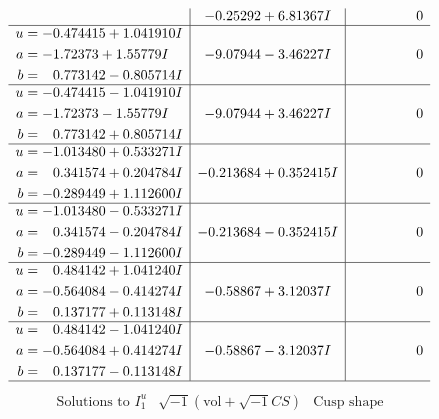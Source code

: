 \documentclass[1p]{elsarticle_modified}
\theoremstyle{definition}
\newcommand{\I}{\sqrt{-1}}
\begin{document}
$$\begin{array}{c|c|c}
 & -0.25292 + 6.81367 I & \phantom{-0.000000 } 0 \\ \hline\begin{aligned}
u &= -0.474415 + 1.041910 I \\
a &= -1.72373 + 1.55779 I \\
b &= \phantom{-}0.773142 - 0.805714 I\end{aligned}
 & -9.07944 - 3.46227 I & \phantom{-0.000000 } 0 \\ \hline\begin{aligned}
u &= -0.474415 - 1.041910 I \\
a &= -1.72373 - 1.55779 I \\
b &= \phantom{-}0.773142 + 0.805714 I\end{aligned}
 & -9.07944 + 3.46227 I & \phantom{-0.000000 } 0 \\ \hline\begin{aligned}
u &= -1.013480 + 0.533271 I \\
a &= \phantom{-}0.341574 + 0.204784 I \\
b &= -0.289449 + 1.112600 I\end{aligned}
 & -0.213684 + 0.352415 I & \phantom{-0.000000 } 0 \\ \hline\begin{aligned}
u &= -1.013480 - 0.533271 I \\
a &= \phantom{-}0.341574 - 0.204784 I \\
b &= -0.289449 - 1.112600 I\end{aligned}
 & -0.213684 - 0.352415 I & \phantom{-0.000000 } 0 \\ \hline\begin{aligned}
u &= \phantom{-}0.484142 + 1.041240 I \\
a &= -0.564084 - 0.414274 I \\
b &= \phantom{-}0.137177 + 0.113148 I\end{aligned}
 & -0.58867 + 3.12037 I & \phantom{-0.000000 } 0 \\ \hline\begin{aligned}
u &= \phantom{-}0.484142 - 1.041240 I \\
a &= -0.564084 + 0.414274 I \\
b &= \phantom{-}0.137177 - 0.113148 I\end{aligned}
 & -0.58867 - 3.12037 I & \phantom{-0.000000 } 0\\
 \hline 
 \end{array}$$\newpage$$\begin{array}{c|c|c}  
\text{Solutions to }I^u_{1}& \I (\text{vol} + \sqrt{-1}CS) & \text{Cusp shape}\\

\end{array}$$
\end{document}
